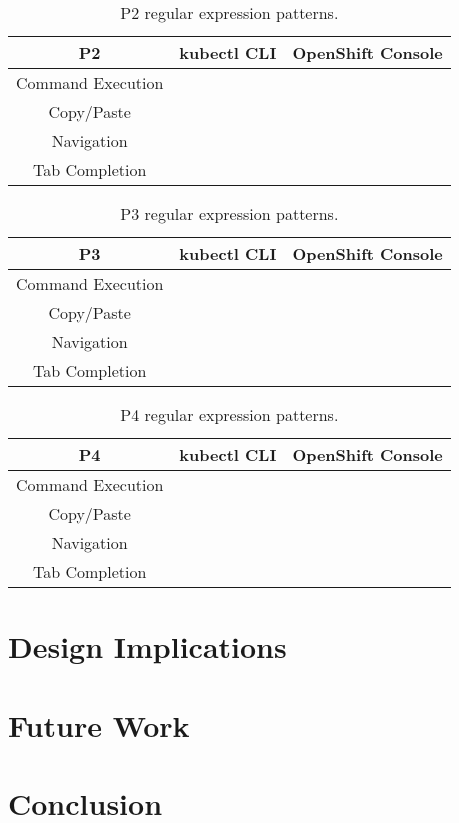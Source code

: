 \documentclass[11pt, oneside]{article}   	%
\begin{document}
\begin{table}
 \centering
  \begin{tabular}{ | c | c | c | } 
  \hline
  P2 & kubectl CLI & OpenShift Console \\ 
  \hline
  Command Execution &  &  \\ 
  \hline
  Copy/Paste & & \\
  \hline
  Navigation & & \\
  \hline
  Tab Completion & & \\
  \hline
  \end{tabular}
 \caption{P2 regular expression patterns.}
\end{table}

\begin{table}
 \centering
  \begin{tabular}{ | c | c | c | } 
  \hline
  P3 & kubectl CLI & OpenShift Console \\ 
  \hline
  Command Execution &  &  \\ 
  \hline
  Copy/Paste & & \\
  \hline
  Navigation & & \\
  \hline
  Tab Completion & & \\
  \hline
  \end{tabular}
 \caption{P3 regular expression patterns.}
\end{table}

\begin{table}
 \centering
  \begin{tabular}{ | c | c | c | } 
  \hline
  P4 & kubectl CLI & OpenShift Console \\ 
  \hline
  Command Execution &  &  \\ 
  \hline
  Copy/Paste & & \\
  \hline
  Navigation & & \\
  \hline
  Tab Completion & & \\
  \hline
  \end{tabular}
 \caption{P4 regular expression patterns.}
\end{table}

\section{Design Implications}

\section{Future Work}

\section{Conclusion}



\end{document}
